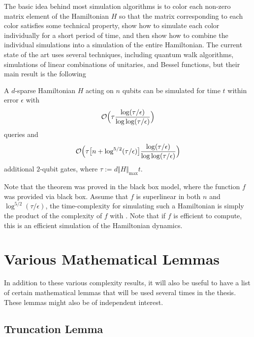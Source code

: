\documentclass[../thesis-main/thesis-main]{subfiles}
\begin{document}
The basic idea behind most simulation algorithms is to color each non-zero matrix element of the Hamiltonian $H$ so that the matrix corresponding to each color satisfies some technical property, show how to simulate each color individually for a short period of time, and then show how to combine the individual simulations into a simulation of the entire Hamiltonian.  The current state of the art \cite{BCK15} uses several techniques, including quantum walk algorithms, simulations of linear combinations of unitaries, and Bessel functions, but their main result is the following
\begin{theorem}\label{thm:hamiltonian_simulation}
A $d$-sparse Hamiltonian $H$ acting on $n$ qubits can be simulated for time $t$ within error $\epsilon$ with
\begin{align}
  \mathcal{O}\Big( \tau \frac{ \log (\tau/\epsilon)}{\log\log (\tau/\epsilon)}\Big)
  \label{eq:hamiltonian_query_bound}
\end{align}
queries and 
\begin{align}
  \mathcal{O}\Big( \tau \big[n + \log^{5/2} (\tau/\epsilon) \big] \frac{\log (\tau/\epsilon)}{\log\log(\tau/\epsilon)}\Big)
  \label{eq:hamiltonian_2qubit_bound}
\end{align}
additional $2$-qubit gates, where $\tau := d \Vert H \Vert_{\max} t$.
\end{theorem}
Note that the theorem was proved in the black box model, where the function $f$ was provided via black box.  Assume that $f$ is superlinear in both $n$ and $\log^{5/2}(\tau/\epsilon)$, the time-complexity for simulating such a Hamiltonian is simply the product of the complexity of $f$ with .  Note that if $f$ is efficient to compute, this is an efficient simulation of the Hamiltonian dynamics.

\section{Various Mathematical Lemmas}

In addition to these various complexity results, it will also be useful to have a list of certain mathematical lemmas that will be used several times in the thesis.  These lemmas might also be of independent interest.
\subsection{Truncation Lemma}
\end{document}
